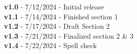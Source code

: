 \textbf{v1.0} - 7/12/2024 - Initial release \\
\textbf{v1.1} - 7/14/2024 - Finished section 1 \\
\textbf{v1.2} - 7/17/2024 - Draft Section 2 \\
\textbf{v1.3} - 7/21/2024 - Finalized section 2 \& 3 \\
\textbf{v1.4} - 7/22/2024 - Spell check \\

